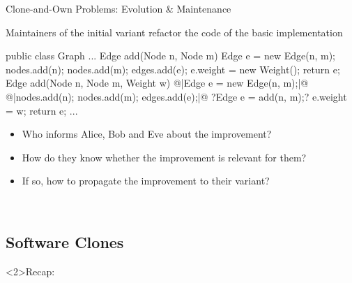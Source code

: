\begin{frame}[fragile]{Clone-and-Own Problems: Evolution \& Maintenance}
	\begin{fancycolumns}[b,widths={43}]
		\begin{example}{}
			Maintainers of the initial variant refactor the code of the basic implementation
		\end{example}
\begin{codetight}{}
public class Graph {
	...
	Edge add(Node n, Node m) {
		Edge e = new Edge(n, m);
		nodes.add(n); nodes.add(m); edges.add(e);
		e.weight = new Weight();
		return e;
	}
	Edge add(Node n, Node m, Weight w) {
		@|Edge e = new Edge(n, m);|@
		@|nodes.add(n); nodes.add(m); edges.add(e);|@
		?Edge e = add(n, m);?
		e.weight = w;
		return e;
	}
	...
}
\end{codetight} %
	\nextcolumn
		\begin{note}{}
			\begin{itemize}
				\item Who informs Alice, Bob and Eve about the improvement?
				\item How do they know whether the improvement is relevant for them?
				\item If so, how to propagate the improvement to their variant?
			\end{itemize}
		\end{note}

		~

		\hfill
		\hfill
	\end{fancycolumns}
\end{frame}

\subsection{Software Clones}

\begin{frame}<2>{Recap: \myframetitle\ \mytitlesource{\lectureintroduction}}
	\frameSoftwareClones
\end{frame}


